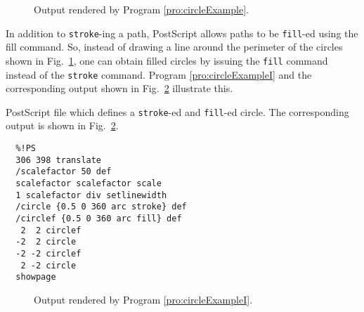 \begin{figure}
  \begin{center}
  \end{center} \caption{Output rendered by Program
  \ref{pro:circleExample}.}
  \label{fig:circleExample}
\end{figure}

In addition to {\tt stroke}-ing a path, PostScript allows paths to be
{\tt fill}-ed using the fill command.  So, instead of drawing a line
around the perimeter of the circles shown in Fig.\
\ref{fig:circleExample}, one can obtain filled circles by issuing the
{\tt fill} command instead of the {\tt stroke} command.  Program
\ref{pro:circleExampleI} and the corresponding output shown in Fig.\
\ref{fig:circleExampleI} illustrate this.
\begin{program}
PostScript file which defines a {\tt stroke}-ed and {\tt fill}-ed circle.
The corresponding output is shown in Fig.\ \ref{fig:circleExampleI}.
\label{pro:circleExampleI}
\codemiddle
\begin{verbatim}
  %!PS
  306 398 translate
  /scalefactor 50 def
  scalefactor scalefactor scale
  1 scalefactor div setlinewidth
  /circle {0.5 0 360 arc stroke} def
  /circlef {0.5 0 360 arc fill} def
   2  2 circlef
  -2  2 circle
  -2 -2 circlef
   2 -2 circle
  showpage
\end{verbatim}
\end{program}

\begin{figure}
  \begin{center}
  \end{center} \caption{Output rendered by Program
  \ref{pro:circleExampleI}.}
  \label{fig:circleExampleI}
\end{figure}

